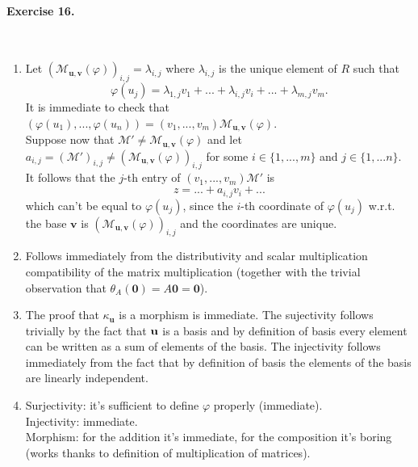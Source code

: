 \documentclass[12pt,a4paper]{report}
\theoremstyle{definition}
\theoremstyle{num.custom-title}
\renewcommand{\phi}{\varphi}
\begin{document}
\paragraph{Exercise 16.} \ 
\begin{enumerate}
\item Let $(\mathcal{M}_{\mathbf{u},\mathbf{v}}(\phi))_{i,j}=\lambda_{i,j}$ where $\lambda_{i,j}$ is the unique element of $R$ such that 
\[
\phi(u_j)=\lambda_{1,j} v_1 + ... + \lambda_{i,j} v_i + ... + \lambda_{m,j} v_m.
\]
It is immediate to check that $(\phi(u_1),...,\phi(u_n))=(v_1,...,v_m) \mathcal{M}_{\mathbf{u},\mathbf{v}}(\phi)$.\\
Suppose now that $\mathcal{M}' \ne \mathcal{M}_{\mathbf{u},\mathbf{v}}(\phi)$ and let $a_{i,j}=(\mathcal{M}')_{i,j} \ne (\mathcal{M}_{\mathbf{u},\mathbf{v}}(\phi))_{i,j}$ for some $i \in \{1,...,m\}$ and $j \in \{1,...n\}$. It follows that the $j$-th entry of $(v_1,...,v_m) \mathcal{M}'$ is
\[
z = ... + a_{i,j} v_i + ...  
\]
which can't be equal to $\phi(u_j)$, since the $i$-th coordinate of $\phi(u_j)$ w.r.t. the base $\mathbf{v}$ is $(\mathcal{M}_{\mathbf{u},\mathbf{v}}(\phi))_{i,j}$ and the coordinates are unique.
\item Follows immediately from the distributivity and scalar multiplication compatibility of the matrix multiplication (together with the trivial observation that $\theta_A(\mathbf 0)=A \mathbf 0=\mathbf 0$).
\item The proof that $\kappa_\mathbf{u}$ is a morphism is immediate. The sujectivity follows trivially by the fact that $\bf u$ is a basis and by definition of basis every element can be written as a sum of elements of the basis. The injectivity follows immediately from the fact that by definition of basis the elements of the basis are linearly independent.
\item Surjectivity: it's sufficient to define $\phi$ properly (immediate).\\
Injectivity: immediate.\\
Morphism: for the addition it's immediate, for the composition it's boring (works thanks to definition of multiplication of matrices).
\end{enumerate}
\end{document}
